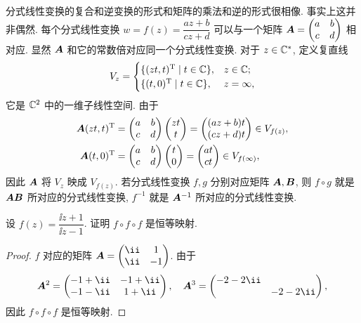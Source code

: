 分式线性变换的复合和逆变换的形式和矩阵的乘法和逆的形式很相像.
事实上这并非偶然.
每个分式线性变换 $w=f(z)=\dfrac{az+b}{cz+d}$ 可以与一个矩阵 ${\boldsymbol{A}}=\begin{pmatrix}
  a&b\\c&d
\end{pmatrix}$ 相对应.
显然 ${\boldsymbol{A}}$ 和它的常数倍对应同一个分式线性变换.
对于 $z\in{\mathbb{C}}^*$, 定义复直线
\[
  V_z=\begin{cases}
    \{(zt,t)^{\mathrm{T}}\mid t\in{\mathbb{C}}\},&z\in{\mathbb{C}};\\
    \{(t,0)^{\mathrm{T}}\mid t\in{\mathbb{C}}\},&z=\infty,
  \end{cases}
\]
它是 ${\mathbb{C}}^2$ 中的一维子线性空间.
由于
\begin{align*}
   {\boldsymbol{A}}(zt,t)^{\mathrm{T}}&
  =\begin{pmatrix}
    a&b\\
    c&d
  \end{pmatrix}\begin{pmatrix}
    zt\\
    t
  \end{pmatrix}
  =\begin{pmatrix}
    (az+b)t\\
    (cz+d)t
  \end{pmatrix}\in V_{f(z)},\\
   {\boldsymbol{A}}(t,0)^{\mathrm{T}}&
  =\begin{pmatrix}
    a&b\\
    c&d
  \end{pmatrix}\begin{pmatrix}
    t\\
    0
  \end{pmatrix}
  =\begin{pmatrix}
    at\\
    ct
  \end{pmatrix}\in V_{f(\infty)},
\end{align*}
因此 ${\boldsymbol{A}}$ 将 $V_z$ 映成 $V_{f(z)}$.
若分式线性变换 $f,g$ 分别对应矩阵 ${\boldsymbol{A}},{\boldsymbol{B}}$, 则 $f\circ g$ 就是 ${\boldsymbol{A}}{\boldsymbol{B}}$ 所对应的分式线性变换, $f^{-1}$ 就是 ${\boldsymbol{A}}^{-1}$ 所对应的分式线性变换.

\begin{example}
  设 $f(z)=\dfrac{\ii z+1}{\ii z-1}$.
  证明 $f\circ f\circ f$ 是恒等映射.
\end{example}

\begin{proof}
  $f$ 对应的矩阵 $\bfA=\begin{pmatrix}
    \ii&1\\
    \ii&-1
  \end{pmatrix}$.
  由于
  \[
    \bfA^2=\begin{pmatrix}
      -1+\ii&-1+\ii\\
      -1-\ii&1+\ii
    \end{pmatrix},\quad
    \bfA^3=\begin{pmatrix}
      -2-2\ii&\\
      &-2-2\ii
    \end{pmatrix},
  \]
  因此 $f\circ f\circ f$ 是恒等映射.
\end{proof}

